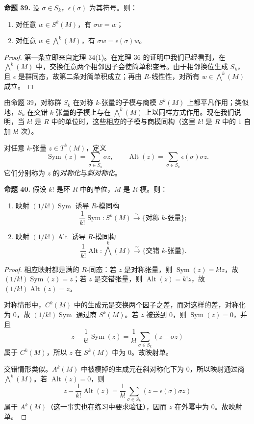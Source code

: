 \noindent\textbf{命题 39.} 设 $\sigma\in S_k$，$\epsilon(\sigma)$ 为其符号。则：
\begin{enumerate}[label=(\arabic*)]
\item 对任意 $w\in S^k(M)$，有 $\sigma w=w$；
\item 对任意 $w\in\bigwedge^k(M)$，有 $\sigma w=\epsilon(\sigma)w$。
\end{enumerate}

\begin{proof}
第一条立即来自定理 34(1)。在定理 36 的证明中我们已经看到，在 $\bigwedge^k(M)$ 中，交换任意两个相邻因子会使简单积变号。由于相邻换位生成 $S_k$，且 $\epsilon$ 是群同态，故第二条对简单积成立；再由 $R$-线性性，对所有 $w\in\bigwedge^k(M)$ 成立。
\end{proof}

由命题 39，对称群 $S_k$ 在对称 $k$-张量的子模与商模 $S^k(M)$ 上都平凡作用；类似地，$S_k$ 在交错 $k$-张量的子模上与在 $\bigwedge^k(M)$ 上以同样方式作用。现在我们说明，当 $k!$ 是 $R$ 中的单位时，这些相应的子模与商模同构（这里 $k!$ 是 $R$ 中的 $1$ 自加 $k!$ 次）。

对任意 $k$-张量 $z\in T^k(M)$，定义
\[
\operatorname{Sym}(z)=\sum_{\sigma\in S_k}\sigma z,
\qquad
\operatorname{Alt}(z)=\sum_{\sigma\in S_k}\epsilon(\sigma)\sigma z.
\]
它们分别称为 $z$ 的\emph{对称化}与\emph{斜对称化}。

\noindent\textbf{命题 40.} 假设 $k!$ 是环 $R$ 中的单位，$M$ 是 $R$-模。则：
\begin{enumerate}[label=(\arabic*)]
\item 映射 $(1/k!)\operatorname{Sym}$ 诱导 $R$-模同构
\[
\frac1{k!}\operatorname{Sym}:S^k(M)\xrightarrow{\sim}\{\text{对称 }k\text{-张量}\};
\]
\item 映射 $(1/k!)\operatorname{Alt}$ 诱导 $R$-模同构
\[
\frac1{k!}\operatorname{Alt}:\bigwedge^k(M)\xrightarrow{\sim}\{\text{交错 }k\text{-张量}\}.
\]
\end{enumerate}

\begin{proof}
相应映射都是满的 $R$-同态：若 $z$ 是对称张量，则 $\operatorname{Sym}(z)=k!z$，故 $(1/k!)\operatorname{Sym}(z)=z$；若 $z$ 是交错张量，则 $\operatorname{Alt}(z)=k!z$，故 $(1/k!)\operatorname{Alt}(z)=z$。

对称情形中，$C^k(M)$ 中的生成元是交换两个因子之差，而对这样的差，对称化为 $0$，故 $(1/k!)\operatorname{Sym}$ 通过商 $S^k(M)$。若 $z$ 被送到 $0$，则 $\operatorname{Sym}(z)=0$，并且
\[
z-\frac1{k!}\operatorname{Sym}(z)
=\frac1{k!}\sum_{\sigma\in S_k}(z-\sigma z)
\]
属于 $C^k(M)$，所以 $z$ 在 $S^k(M)$ 中为 $0$。故映射单。

交错情形类似。$A^k(M)$ 中被模掉的生成元在斜对称化下为 $0$，所以映射通过商 $\bigwedge^k(M)$。若 $\operatorname{Alt}(z)=0$，则
\[
z-\frac1{k!}\operatorname{Alt}(z)
=\frac1{k!}\sum_{\sigma\in S_k}(z-
\epsilon(\sigma)\sigma z)
\]
属于 $A^k(M)$（这一事实也在练习中要求验证），因而 $z$ 在外幂中为 $0$。故映射单。
\end{proof}

